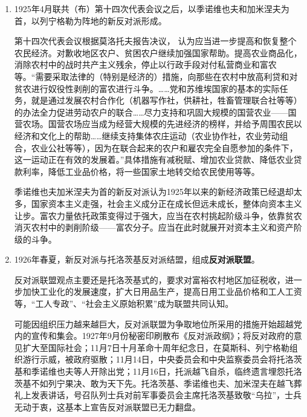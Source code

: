 \begin{enumerate}
  笔者认为，联共（布）中央此时论断更为正确性。托洛茨基反对派的意见毫无疑问会进一步加大农村矛盾，破坏工农联盟，理论上过于简单莽撞和一厢情愿。但是斯大林在“粮食危机”后的表现又毫无疑问学习和贯彻了这种“应用杜冈主义”的托洛茨基反对派意见。

\item 1925年4月联共（布）第十四次代表会议之后，以季诺维也夫和加米涅夫为首，以列宁格勒为阵地的新反对派形成。

  第十四次代表会议根据莫洛托夫报告决议， 认为应当进一步提高和恢复整个农民经济。对歉收地区农户、贫困农户继续加强国家帮助。提高农业商品化，消除农村中的战时共产主义残余，停止以行政手段对付私营商业和富农等。“需要采取法律的（特别是经济的）措施，向那些在农村中放高利贷和对贫农进行奴役性剥削的富农进行斗争。……党和苏维埃国家的基本的实际任务，就是通过发展农村合作化（机器写作社，供耕社，牲畜管理联合社等等）的办法全力促进劳动农户的联合……尽力支持和巩固大规模的国营农业——国营农场。国营农场应当成为经营大规模的先进经济的榜样，并给予周围农民以经济和文化上的帮助……继续支持集体农庄运动（农业协作社，农业劳动组合，农业公社等等），因为在联合起来的农户和雇农完全自愿参加的条件下，这一运动正在有效的发展着。”具体措施有减税赋、增加农业贷款、降低农业贷款利率，降低工业品价格，将一些国家土地转交给农民使用等等。

  季诺维也夫加米涅夫为首的新反对派认为1925年以来的新经济政策已经退却太多，国家资本主义走强，社会主义成分正在成长但远未成长，整体向资本主义让步。富农力量依托政策变得过于强大，应当在农村挑起阶级斗争，依靠贫农消灭农村中的剥削阶级——富农分子。应当在此时就展开对资本主义和资产阶级的斗争。

\item 1926年春夏，新反对派与托洛茨基反对派结盟，组成\textbf{反对派联盟}。

  反对派联盟观点主要还是托洛茨基式的，要求对富裕农村地区加征税收，进一步加快工业化的发展速度，扩大日用品生产，提高日用工业品价格和工人工资等，“工人专政”、“社会主义原始积累”成为联盟共同认知。

  可能因组织压力越来越巨大，反对派联盟为争取地位所采用的措施开始超越党内的宣传和集会。1927年9月份秘密印刷散布《反对派政纲》；将反对政府的意见扩大至国际社会；11月7日十月革命十周年纪念日，在莫斯科、列宁格勒组织游行示威，被政府驱散；11月14日，中央委员会和中央监察委员会将托洛茨基和季诺维也夫等人开除出党；11月16日，托派越飞自杀，临终遗言埋怨托洛茨基不如列宁果决、敢为天下先。托洛茨基、季诺维也夫、加米涅夫在越飞葬礼上发表讲话，号召队列士兵对前军事委员会主席托洛茨基致敬“乌拉”，士兵无动于衷，这基本上宣告反对派联盟已无力翻盘。


\end{enumerate}
